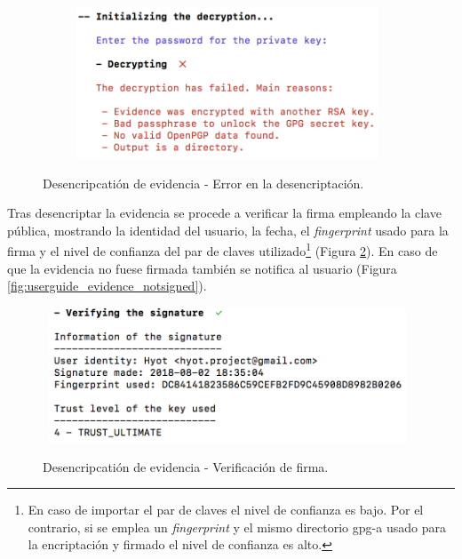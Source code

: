 \documentclass[12pt,a4paper, twoside]{report}
\begin{document}
		\begin{figure}[!ht]   
			\caption{Desencripcatión de evidencia - Error en la desencriptación.} 
			\begin{center} 					\includegraphics[width=11cm,height=4.5cm]{Images/userGuide/evidence/error_decryption} \\
				\label{fig:userguide_evidence_error_decryption} 
			\end{center}  
		\end{figure}

	Tras desencriptar la evidencia se procede a verificar la firma empleando la clave pública, mostrando la identidad del usuario, la fecha, el \textit{fingerprint} usado para la firma y el nivel de confianza del par de claves utilizado\footnote{En caso de importar el par de claves el nivel de confianza es bajo. Por el contrario, si se emplea un \textit{fingerprint} y el mismo directorio \gls{gpg-a} usado para la encriptación y firmado el nivel de confianza es alto.} (Figura \ref{fig:userguide_evidence_sign}). En caso de que la evidencia no fuese firmada también se notifica al usuario (Figura \ref{fig:userguide_evidence_notsigned}). \\
	
		\begin{figure}[!ht]   
			\caption{Desencripcatión de evidencia - Verificación de firma.} 
			\begin{center} 					\includegraphics[width=11cm,height=4cm]{Images/userGuide/evidence/sign} \\
				\label{fig:userguide_evidence_sign} 
			\end{center}  
		\end{figure}
		
\end{document}
